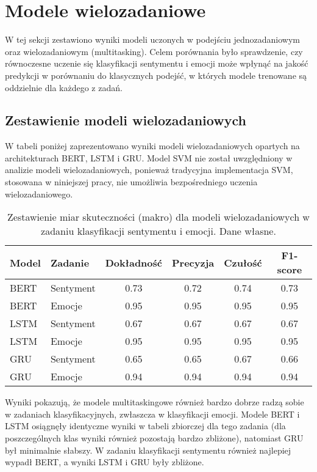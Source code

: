 \section{Modele wielozadaniowe}

W tej sekcji zestawiono wyniki modeli uczonych w podejściu jednozadaniowym oraz wielozadaniowym (multitasking). Celem porównania było sprawdzenie, czy równoczesne uczenie się klasyfikacji sentymentu i emocji może wpłynąć na jakość predykcji w porównaniu do klasycznych podejść, w których modele trenowane są oddzielnie dla każdego z zadań.

\subsection{Zestawienie modeli wielozadaniowych}

W tabeli poniżej zaprezentowano wyniki modeli wielozadaniowych opartych na architekturach BERT, LSTM i GRU. Model SVM nie został uwzględniony w analizie modeli wielozadaniowych, ponieważ tradycyjna implementacja SVM, stosowana w niniejszej pracy, nie umożliwia bezpośredniego uczenia wielozadaniowego.

\newpage

\begin{table}[H]
\centering
\label{tab:multitask_models}
\begin{tabular}{|l|l|c|c|c|c|}
\hline
\textbf{Model} & \textbf{Zadanie} & \textbf{Dokładność} & \textbf{Precyzja} & \textbf{Czułość} & \textbf{F1-score} \\
\hline
BERT & Sentyment & 0.73 & 0.72 & 0.74 & 0.73 \\
BERT & Emocje    & 0.95 & 0.95 & 0.95 & 0.95 \\
\hline
LSTM & Sentyment & 0.67 & 0.67 & 0.67 & 0.67 \\
LSTM & Emocje    & 0.95 & 0.95 & 0.95 & 0.95 \\
\hline
GRU &  Sentyment & 0.65 & 0.65 & 0.67 & 0.66 \\
GRU &  Emocje    & 0.94 & 0.94 & 0.94 & 0.94 \\
\hline
\end{tabular}
\caption{
Zestawienie miar skuteczności (makro) dla modeli wielozadaniowych w zadaniu klasyfikacji sentymentu i emocji. Dane własne.}
\end{table}

Wyniki pokazują, że modele multitaskingowe również bardzo dobrze radzą sobie w zadaniach klasyfikacyjnych, zwłaszcza w klasyfikacji emocji. Modele BERT i LSTM osiągnęły identyczne wyniki w tabeli zbiorczej dla tego zadania (dla poszczególnych klas wyniki również pozostają bardzo zbliżone), natomiast GRU był minimalnie słabszy. W zadaniu klasyfikacji sentymentu również najlepiej wypadł BERT, a wyniki LSTM i GRU były zbliżone.

